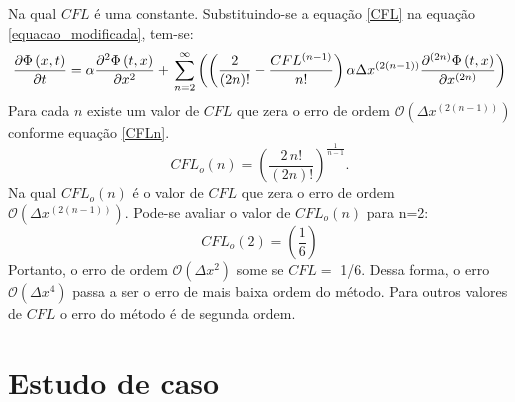 \documentclass[10pt,twoside,a4paper]{article}
\begin{document}
Na qual $CFL$ é uma constante. Substituindo-se a equação \ref{CFL} na equação \ref{equacao_modificada}, tem-se:
\begin{equation} \label{equacao_modificadaCFL}
\frac{\partial \Phi \left( x,t \right)}{\partial t} = \alpha \frac{\partial^{2} \Phi \left(t, x\right)}{\partial x^{2}}+ \\
\sum\limits_{n=2}^{\infty}\left( \left(\frac{ 2  }{\left(2n\right)!} -\frac{CFL^{\left(n-1\right)}  }{n!}\right) \alpha \Delta x^{\left(2\left(n-1\right)\right)} \frac{\partial^{\left(2n\right)} \Phi \left(t, x\right)}{\partial x^{\left(2n\right)}}\right)
\end{equation}
Para cada $n$ existe um valor de $CFL$ que zera o erro de ordem  $\mathcal{O}\left(\Delta x^{\left(2\left(n-1\right)\right)}\right)$ conforme equação \ref{CFLn}.
\begin{equation} \label{CFLn}
CFL_o\left(n\right)=\left(\frac{2 \, n!}{(2n)!}\right)^\frac{1}{n-1}.
\end{equation}
Na qual $CFL_o\left(n\right)$ é o valor de $CFL$ que zera o erro de ordem  $\mathcal{O}\left(\Delta x^{\left(2\left(n-1\right)\right)}\right)$. Pode-se avaliar o valor de $CFL_o\left(n\right)$ para n=2:
\begin{equation} \label{CFL_otimo}
CFL_o\left(2\right)=\left(\frac{1}{6}\right)
\end{equation}
Portanto, o erro de ordem $\mathcal{O}(\Delta x^2)$ some se $CFL=$ 1/6. Dessa forma, o erro $\mathcal{O}(\Delta x^4)$ passa a ser o erro de mais baixa ordem do método. Para outros valores de $CFL$ o erro do método é de segunda ordem.
\section{Estudo de caso} %
\end{document}
